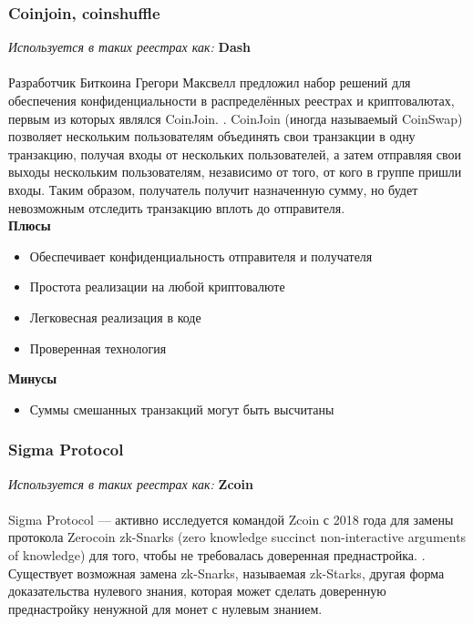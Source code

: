 \subsubsection{Coinjoin, coinshuffle}
\emph{Используется в таких реестрах как: } \textbf{ Dash } \\\\
Разработчик Биткоина Грегори Максвелл предложил набор решений для обеспечения
конфиденциальности в распределённых реестрах и криптовалютах, первым из которых
являлся CoinJoin. \cite{Maurera}. CoinJoin (иногда называемый CoinSwap)
позволяет нескольким пользователям объединять свои транзакции в одну
транзакцию, получая входы от нескольких пользователей, а затем отправляя свои
выходы нескольким пользователям, независимо от того, от кого в группе пришли
входы. Таким образом, получатель получит назначенную сумму, но будет
невозможным отследить транзакцию вплоть до отправителя.\\
\textbf{Плюсы}
\begin{itemize}
    \item Обеспечивает конфиденциальность отправителя и получателя
    \item Простота реализации на любой криптовалюте
    \item Легковесная реализация в коде
    \item Проверенная технология
\end{itemize}
\textbf{Минусы}
\begin{itemize}
    \item Суммы смешанных транзакций могут быть высчитаны
\end{itemize}

\subsubsection{Sigma Protocol}
\emph{Используется в таких реестрах как: } \textbf{Zcoin} \\\\
Sigma Protocol --- активно исследуется командой Zcoin с 2018 года для замены
протокола Zerocoin zk-Snarks (zero knowledge succinct non-interactive arguments of
knowledge) для того, чтобы не требовалась доверенная
преднастройка. \cite{Groth2015}. Существует возможная замена zk-Snarks,
называемая zk-Starks, другая форма доказательства нулевого знания, которая
может сделать доверенную преднастройку ненужной для монет с нулевым знанием.

